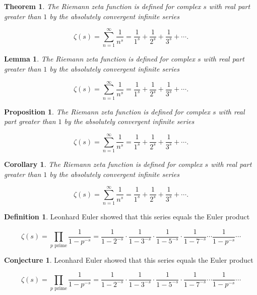 \documentclass[english,oneside, article]{memoir}
\theoremstyle{plain}
\newtheorem{Theorem}{Theorem}[chapter]
\newtheorem*{Lemma}{Lemma}
\newtheorem*{Proposition}{Proposition}
\newtheorem*{Corollary}{Corollary}
\theoremstyle{definition}
\newtheorem{Definition}{Definition}[chapter]
\newtheorem{Conjecture}{Conjecture}[chapter]
\theoremstyle{remark}
\begin{document}
\begin{Theorem}

The Riemann zeta function is defined for complex \(s\) with real part
greater than \(1\) by the absolutely convergent infinite series

\[\zeta(s) = \sum_{n=1}^\infty \frac{1}{n^s} = \frac{1}{1^s} + \frac{1}{2^s} + \frac{1}{3^s} + \cdots.\]

\end{Theorem}

\begin{Lemma}

The Riemann zeta function is defined for complex \(s\) with real part
greater than \(1\) by the absolutely convergent infinite series

\[\zeta(s) = \sum_{n=1}^\infty \frac{1}{n^s} = \frac{1}{1^s} + \frac{1}{2^s} + \frac{1}{3^s} + \cdots.\]

\end{Lemma}

\begin{Proposition}

The Riemann zeta function is defined for complex \(s\) with real part
greater than \(1\) by the absolutely convergent infinite series

\[\zeta(s) = \sum_{n=1}^\infty \frac{1}{n^s} = \frac{1}{1^s} + \frac{1}{2^s} + \frac{1}{3^s} + \cdots.\]

\end{Proposition}

\begin{Corollary}

The Riemann zeta function is defined for complex \(s\) with real part
greater than \(1\) by the absolutely convergent infinite series

\[\zeta(s) = \sum_{n=1}^\infty \frac{1}{n^s} = \frac{1}{1^s} + \frac{1}{2^s} + \frac{1}{3^s} + \cdots.\]

\end{Corollary}

\begin{Definition}

Leonhard Euler showed that this series equals the Euler product

\[\zeta(s) = \prod_{p \text{ prime}} \frac{1}{1-p^{-s}}= \frac{1}{1-2^{-s}}\cdot\frac{1}{1-3^{-s}}\cdot\frac{1}{1-5^{-s}}\cdot\frac{1}{1-7^{-s}} \cdots \frac{1}{1-p^{-s}} \cdots\]

\end{Definition}

\begin{Conjecture}

Leonhard Euler showed that this series equals the Euler product

\[\zeta(s) = \prod_{p \text{ prime}} \frac{1}{1-p^{-s}}= \frac{1}{1-2^{-s}}\cdot\frac{1}{1-3^{-s}}\cdot\frac{1}{1-5^{-s}}\cdot\frac{1}{1-7^{-s}} \cdots \frac{1}{1-p^{-s}} \cdots\]

\end{Conjecture}
\end{document}
